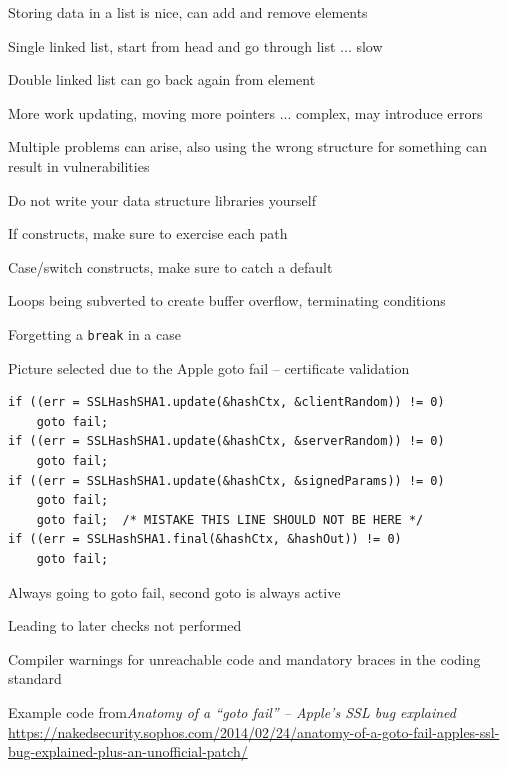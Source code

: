 \documentclass[Screen16to9,17pt]{foils}
\begin{document}

\begin{list2}
\item Storing data in a list is nice, can add and remove elements
\item Single linked list, start from head and go through list ... slow
\item Double linked list can go back again from element
\item More work updating, moving more pointers ... complex, may introduce errors
\item Multiple problems can arise, also using the wrong structure for something can result in vulnerabilities
\end{list2}

\vskip 1cm
\centerline{Do not write your data structure libraries yourself}




\begin{list2}
\item If constructs, make sure to exercise each path
\item Case/switch constructs, make sure to catch a default
\item Loops being subverted to create buffer overflow, terminating conditions
\item Forgetting a \verb+break+ in a case
\item Picture selected due to the Apple goto fail -- certificate validation\\
\end{list2}




\begin{verbatim}
if ((err = SSLHashSHA1.update(&hashCtx, &clientRandom)) != 0)
    goto fail;
if ((err = SSLHashSHA1.update(&hashCtx, &serverRandom)) != 0)
    goto fail;
if ((err = SSLHashSHA1.update(&hashCtx, &signedParams)) != 0)
    goto fail;
    goto fail;  /* MISTAKE THIS LINE SHOULD NOT BE HERE */
if ((err = SSLHashSHA1.final(&hashCtx, &hashOut)) != 0)
    goto fail;
\end{verbatim}

\begin{list2}
\item Always going to goto fail, second goto is always active
\item Leading to later checks not performed
\item Compiler warnings for unreachable code and mandatory braces in the coding standard
\item Example code from\emph{Anatomy of a “goto fail” – Apple’s SSL bug explained}\\ {\footnotesize\url{https://nakedsecurity.sophos.com/2014/02/24/anatomy-of-a-goto-fail-apples-ssl-bug-explained-plus-an-unofficial-patch/}}
\end{list2}
\end{document}
